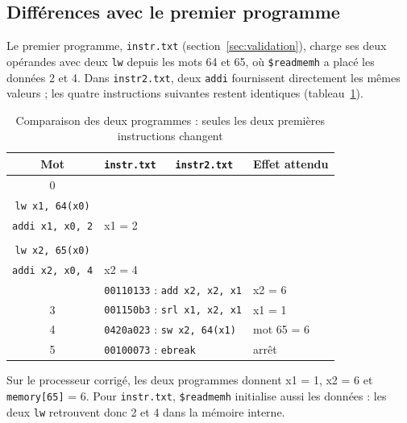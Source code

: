 \subsection{Différences avec le premier programme}
\label{sec:instr}

Le premier programme, \texttt{instr.txt} (section~\ref{sec:validation}), charge ses deux
opérandes avec deux \texttt{lw} depuis les mots 64 et 65, où \texttt{\$readmemh} a placé les
données 2 et 4. Dans \texttt{instr2.txt}, deux \texttt{addi} fournissent directement les mêmes
valeurs ; les quatre instructions suivantes restent identiques
(tableau~\ref{tab:programmes-comparaison}).

\begin{table}[H]
\centering
\small
\begin{tabularx}{\linewidth}{cllX}
\toprule
Mot & \texttt{instr.txt} & \texttt{instr2.txt} & Effet attendu \\
\midrule
0 & \makecell[tl]{\texttt{04002083}\\\texttt{lw x1, 64(x0)}} &
    \makecell[tl]{\texttt{00200093}\\\texttt{addi x1, x0, 2}} & x1 = 2 \\
\addlinespace
1 & \makecell[tl]{\texttt{04102103}\\\texttt{lw x2, 65(x0)}} &
    \makecell[tl]{\texttt{00400113}\\\texttt{addi x2, x0, 4}} & x2 = 4 \\
\addlinespace
2 & \multicolumn{2}{l}{\texttt{00110133} : \texttt{add x2, x2, x1}} & x2 = 6 \\
3 & \multicolumn{2}{l}{\texttt{001150b3} : \texttt{srl x1, x2, x1}} & x1 = 1 \\
4 & \multicolumn{2}{l}{\texttt{0420a023} : \texttt{sw x2, 64(x1)}} & mot 65 = 6 \\
5 & \multicolumn{2}{l}{\texttt{00100073} : \texttt{ebreak}} & arrêt \\
\bottomrule
\end{tabularx}
\caption{Comparaison des deux programmes : seules les deux premières instructions changent}
\label{tab:programmes-comparaison}
\end{table}

Sur le processeur corrigé, les deux programmes donnent x1 = 1, x2 = 6 et
\texttt{memory[65]} = 6. Pour \texttt{instr.txt}, \texttt{\$readmemh} initialise aussi les
données : les deux \texttt{lw} retrouvent donc 2 et 4 dans la mémoire interne.

